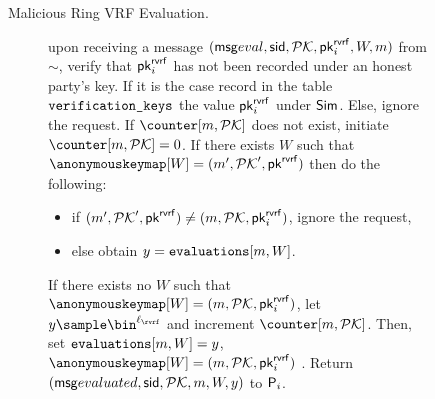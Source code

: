 \begin{figure}
\begin{tcolorbox}
{\begin{description}
				\item[Malicious Ring VRF Evaluation.] upon receiving a message $(\mathsf{msg}{eval}, \textsf{sid}, {\mathcal{PK}}, \mathsf{pk}^{\mathsf{rvrf}}_i, W, m)$ from $\sim$, verify that $ \mathsf{pk}^{\mathsf{rvrf}}_i $ has not been recorded under an honest party's key.
			    If it is the case record in the table $\texttt{verification\_keys}$ the value $\mathsf{pk}^{\mathsf{rvrf}}_i$ under $\mathsf{Sim}$. Else, ignore the request.  If $ \counter[m,\pkring] $ does not exist, initiate $ \counter[m,\pkring] = 0 $.
			    If there exists $ W $ such that $ \anonymouskeymap[W] = (m',\pkring', \pkrvrf)$ then do the following:
			    \begin{itemize}
			    	\item if $(m', {\mathcal{PK}}', \mathsf{pk}^{\mathsf{rvrf}}) \neq  (m, {\mathcal{PK}}, \mathsf{pk}^{\mathsf{rvrf}}_i)  $, ignore the request,
			    	\item else obtain $ y = \texttt{evaluations}[m, W]   $. 
			    \end{itemize}
				If there exists no $ W $ such that $ \anonymouskeymap[W] = (m, \pkring, \pkrvrf_i) $, let   $y \sample \bin^{\ell_\rvrf}$ and increment $ \counter[m,\pkring] $. Then, set $ \texttt{evaluations}[m, W] = y$, $ \anonymouskeymap[W] = (m, \pkring,\pkrvrf_i) $ .
				Return $(\mathsf{msg}{evaluated}, \textsf{sid}, {\mathcal{PK}}, m, W, y)$ to $ \mathsf{P}_i $.
				
				
				

\end{description}}
\end{tcolorbox}
\end{figure}
